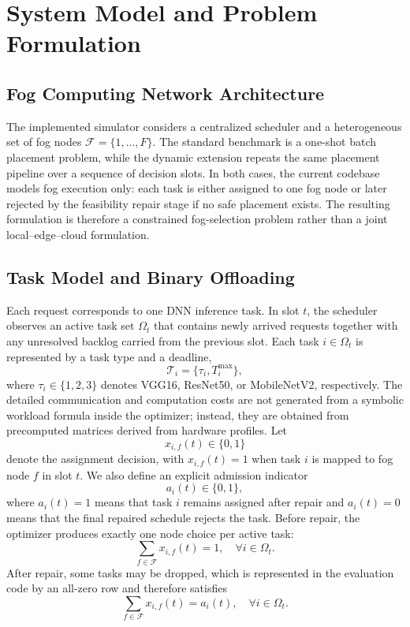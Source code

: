 \section{System Model and Problem Formulation}

\subsection{Fog Computing Network Architecture}
The implemented simulator considers a centralized scheduler and a heterogeneous set of fog nodes $\mathcal{F}=\{1,\dots,F\}$. The standard benchmark is a one-shot batch placement problem, while the dynamic extension repeats the same placement pipeline over a sequence of decision slots. In both cases, the current codebase models fog execution only: each task is either assigned to one fog node or later rejected by the feasibility repair stage if no safe placement exists. The resulting formulation is therefore a constrained fog-selection problem rather than a joint local--edge--cloud formulation.

\subsection{Task Model and Binary Offloading}
Each request corresponds to one DNN inference task. In slot $t$, the scheduler observes an active task set $\Omega_t$ that contains newly arrived requests together with any unresolved backlog carried from the previous slot. Each task $i \in \Omega_t$ is represented by a task type and a deadline,
\begin{equation}
    \mathcal{T}_i = \{\tau_i, T_i^{\max}\},
\end{equation}
where $\tau_i \in \{1,2,3\}$ denotes VGG16, ResNet50, or MobileNetV2, respectively. The detailed communication and computation costs are not generated from a symbolic workload formula inside the optimizer; instead, they are obtained from precomputed matrices derived from hardware profiles. Let
\begin{equation}
    x_{i,f}(t) \in \{0,1\}
\end{equation}
denote the assignment decision, with $x_{i,f}(t)=1$ when task $i$ is mapped to fog node $f$ in slot $t$. We also define an explicit admission indicator
\begin{equation}
    a_i(t) \in \{0,1\},
\end{equation}
where $a_i(t)=1$ means that task $i$ remains assigned after repair and $a_i(t)=0$ means that the final repaired schedule rejects the task. Before repair, the optimizer produces exactly one node choice per active task:
\begin{equation}
    \sum_{f \in \mathcal{F}} x_{i,f}(t)=1,\quad \forall i \in \Omega_t.
\end{equation}
After repair, some tasks may be dropped, which is represented in the evaluation code by an all-zero row and therefore satisfies
\begin{equation}
    \sum_{f \in \mathcal{F}} x_{i,f}(t)=a_i(t),\quad \forall i \in \Omega_t.
\end{equation}

